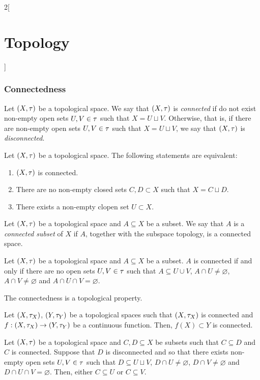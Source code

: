 \documentclass[../../../main.tex]{subfiles}
\begin{document}
\begin{multicols}{2}[\section{Topology}]
    \subsubsection{Connectedness}
    \begin{definition}
        Let $(X,\tau)$ be a topological space. We say that $(X,\tau)$ is \emph{connected} if do not exist non-empty open sets $U,V\in\tau$ such that $X=U\sqcup V$. Otherwise, that is, if there are non-empty open sets $U,V\in\tau$ such that $X=U\sqcup V$, we say that $(X,\tau)$ is \emph{disconnected}.
    \end{definition}
    \begin{prop}
        Let $(X,\tau)$ be a topological space. The following statements are equivalent:
        \begin{enumerate}
            \item $(X,\tau)$ is connected.
            \item There are no non-empty closed sets $C,D\subset X$ such that $X=C\sqcup D$.
            \item There exists a non-empty clopen set $U\subset X$.
        \end{enumerate}
    \end{prop}
    \begin{definition}
        Let $(X,\tau)$ be a topological space and $A\subseteq X$ be a subset. We say that $A$ is a \emph{connected subset} of $X$ if $A$, together with the subspace topology, is a connected space.
    \end{definition}
    \begin{prop}
        Let $(X,\tau)$ be a topological space and $A\subseteq X$ be a subset. $A$ is connected if and only if there are no open sets $U,V\in \tau$ such that $A\subseteq U\cup V$, $A\cap U\ne\varnothing$, $A\cap V\ne\varnothing$ and $A\cap U\cap V=\varnothing$.
    \end{prop}
    \begin{prop}
        The connectedness is a topological property.
    \end{prop}
    \begin{theorem}
        Let $(X,\tau_X)$, $(Y,\tau_Y)$ be a topological spaces such that $(X,\tau_X)$ is connected and $f:(X,\tau_X)\rightarrow(Y,\tau_Y)$ be a continuous function. Then, $f(X)\subset Y$ is connected.
    \end{theorem}
    \begin{lemma}
        Let $(X,\tau)$ be a topological space and $C,D\subseteq X$ be subsets such that $C\subseteq D$ and $C$ is connected. Suppose that $D$ is disconnected and so that there exists non-empty open sets $U,V\in\tau$ such that $D\subseteq U\sqcup V$, $D\cap U\ne\varnothing$, $D\cap V\ne\varnothing$ and $D\cap U\cap V=\varnothing$. Then, either $C\subseteq U$ or $C\subseteq V$.

\end{lemma}
\end{multicols}
\end{document}
